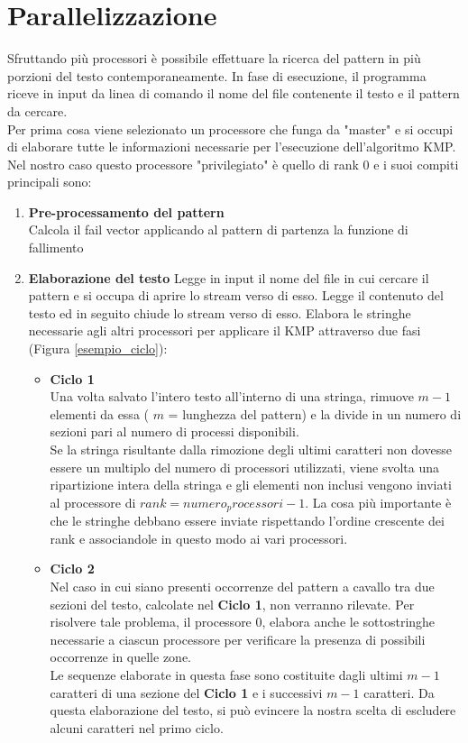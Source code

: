\section{Parallelizzazione}\label{Parallel}
Sfruttando più processori è possibile effettuare la ricerca del pattern in più porzioni del testo contemporaneamente. In fase di esecuzione, il programma riceve in input da linea di comando il nome del file contenente il testo e il pattern da cercare. \\ Per prima cosa viene selezionato un processore che funga da "master" e si occupi di elaborare tutte le informazioni necessarie per l'esecuzione dell'algoritmo KMP. Nel nostro caso questo processore "privilegiato" è quello di rank 0 e i suoi compiti principali sono:
\begin{enumerate}

\item{\textbf{Pre-processamento del pattern}\\
Calcola il fail vector applicando al pattern di partenza la funzione di fallimento
}
\item{\textbf{Elaborazione del testo}
Legge in input il nome del file in cui cercare il pattern e si occupa di aprire lo stream verso di esso. Legge il contenuto del testo ed in seguito chiude lo stream verso di esso. Elabora le stringhe necessarie agli altri processori per applicare il KMP attraverso due fasi (Figura \ref{esempio_ciclo}):
\begin{itemize}
\item{\textbf{Ciclo 1}\\
Una volta salvato l'intero testo all'interno di una stringa, rimuove $m-1$ elementi da essa ( $m$ = lunghezza del pattern) e la divide in un numero di sezioni pari al numero di processi disponibili.\\Se la stringa risultante dalla rimozione degli ultimi caratteri non dovesse essere un multiplo del numero di processori utilizzati, viene svolta una ripartizione intera della stringa e gli elementi non inclusi vengono inviati al processore di $rank=numero_processori-1$. La cosa più importante è che le stringhe debbano essere inviate rispettando l'ordine crescente dei rank e associandole in questo modo ai vari processori.
}
\item{\textbf{Ciclo 2}\\
Nel caso in cui siano presenti occorrenze del pattern a cavallo tra due sezioni del testo, calcolate nel \textbf{Ciclo 1}, non verranno rilevate. Per risolvere tale problema, il processore $0$, elabora anche le sottostringhe necessarie a ciascun processore per verificare la presenza di possibili occorrenze in quelle zone.\\Le sequenze elaborate in questa fase sono costituite dagli ultimi $m-1$ caratteri di una sezione del \textbf{Ciclo 1} e i successivi $m-1$ caratteri. Da questa elaborazione del testo, si può evincere la nostra scelta di escludere alcuni caratteri nel primo ciclo.
}
\end{itemize}}
\end{enumerate}
